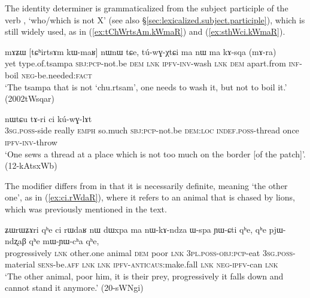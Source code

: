 The identity determiner  is grammaticalized from the subject participle of the verb ,  `who/which is not X' (see also §\ref{sec:lexicalized.subject.participle}), which is still widely used, as in (\ref{ex:tChWrtsAm.kWmaR}) and (\ref{ex:sthWci.kWmaR}).



\begin{exe}
\ex \label{ex:tChWrtsAm.kWmaR}
\gll mɤʑɯ [tɕʰirtsɤm kɯ-maʁ] nɯnɯ tɕe, tú-wɣ-χtɕi ma nɯ ma kɤ-sqa (mɤ-ra) \\
yet type.of.tsampa \textsc{sbj}:\textsc{pcp}-not.be \textsc{dem} \textsc{lnk} \textsc{ipfv}-\textsc{inv}-wash \textsc{lnk} \textsc{dem} apart.from \textsc{inf}-boil \textsc{neg}-be.needed:\textsc{fact} \\
\glt `The tsampa that is not `chu.rtsam', one needs to wash it, but not to boil it.' (2002tWsqar)
\end{exe}

\begin{exe}
\ex \label{ex:sthWci.kWmaR}
 nɯtɕu tɤ-ri ci kú-wɣ-lɤt \\
\textsc{3sg}.\textsc{poss}-side really \textsc{emph} so.much \textsc{sbj}:\textsc{pcp}-not.be \textsc{dem}:\textsc{loc} \textsc{indef}.\textsc{poss}-thread once \textsc{ipfv}-\textsc{inv}-throw \\
\glt `One sews a thread at a place which is not too much on the border [of the patch]'. (12-kAtsxWb)
\end{exe}

The modifier  differs from  in that it is necessarily definite, meaning `the other one', as in (\ref{ex:ci.rWdaR}), where it refers to an animal that is chased by lions, which was previously mentioned in the text.

\begin{exe}
\ex \label{ex:ci.rWdaR}
\gll ʑɯrɯʑɤri qʰe ci rɯdaʁ nɯ dɯxpa ma nɯ-kɤ-ndza ɯ-spa ɲɯ-ɕti qʰe, qʰe pjɯ-ndʐaβ qʰe mɯ-ɲɯ-cʰa qʰe, \\
progressively \textsc{lnk} other.one animal \textsc{dem} poor \textsc{lnk} \textsc{3pl}.\textsc{poss}-\textsc{obj}:\textsc{pcp}-eat \textsc{3sg}.\textsc{poss}-material \textsc{sens}-be.\textsc{aff} \textsc{lnk} \textsc{lnk} \textsc{ipfv}-\textsc{anticaus}:make.fall \textsc{lnk} \textsc{neg}-\textsc{ipfv}-can \textsc{lnk} \\
\glt `The other animal, poor him, it is their prey, progressively it falls down and cannot stand it anymore.' (20-sWNgi)
\end{exe}

